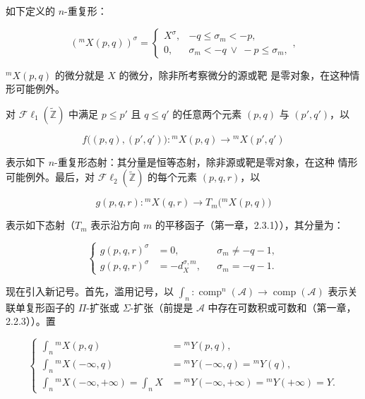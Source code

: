 \clearpage
{}%
\begingroup\small\setlength{\parskip}{0pt}\setlength{\emergencystretch}{1.5em}
\setlength{\abovedisplayskip}{4pt plus 2pt minus 2pt}%
\setlength{\belowdisplayskip}{4pt plus 2pt minus 2pt}%

\noindent 如下定义的 $n$-重复形：

\begin{equation}
({}^{m}\!X(p,q))^\sigma=
\begin{cases}
X^\sigma,&-q\leq\sigma_m<-p,\\
0,&\sigma_m<-q\ \lor\ -p\leq\sigma_m,
\end{cases},
\tag{4.1.6.1}
\end{equation}

\noindent ${}^{m}\!X(p,q)$ 的微分就是 $X$ 的微分，除非所考察微分的源或靶
是零对象，在这种情形可能例外。

对 $\mathcal{F}\ell_1(\widetilde{\mathbb Z})$ 中满足 $p\leq p'$ 且
$q\leq q'$ 的任意两个元素 $(p,q)$ 与 $(p',q')$，以

\begin{equation}
f\bigl((p,q),(p',q')\bigr)\colon
{}^{m}\!X(p,q)\longrightarrow{}^{m}\!X(p',q')
\tag{4.1.6.2}
\end{equation}

表示如下 $n$-重复形态射：其分量是恒等态射，除非源或靶是零对象，在这种
情形可能例外。最后，对
$\mathcal{F}\ell_2(\widetilde{\mathbb Z})$ 的每个元素 $(p,q,r)$，以

\begin{equation}
g(p,q,r)\colon{}^{m}\!X(q,r)
\longrightarrow T_m\bigl({}^{m}\!X(p,q)\bigr)
\tag{4.1.6.3}
\end{equation}

表示如下态射（$T_m$ 表示沿方向 $m$ 的平移函子（第一章，2.3.1）），其分量为：

\begin{equation}
\left\{
\begin{aligned}
g(p,q,r)^\sigma&=0,
  &&\sigma_m\neq-q-1,\\
g(p,q,r)^\sigma&=-d_X^{\sigma,m},
  &&\sigma_m=-q-1.
\end{aligned}
\right.
\tag{4.1.6.4}
\end{equation}

现在引入新记号。首先，滥用记号，以
$\int_n\colon\operatorname{comp}^n(\mathcal A)\longrightarrow
\operatorname{comp}(\mathcal A)$ 表示关联单复形函子的 $\Pi$-扩张或
$\Sigma$-扩张（前提是 $\mathcal A$ 中存在可数积或可数和（第一章，
2.2.3））。置

\begin{equation}
\left\{
\begin{aligned}
\int_n{}^{m}\!X(p,q)
  &={}^{m}\!Y(p,q),\\
\int_n{}^{m}\!X(-\infty,q)
  &={}^{m}\!Y(-\infty,q)={}^{m}\!Y(q),\\
\int_n{}^{m}\!X(-\infty,+\infty)=\int_n X
  &={}^{m}\!Y(-\infty,+\infty)={}^{m}\!Y(+\infty)=Y.
\end{aligned}
\right.
\tag{4.1.6.5}
\end{equation}
\endgroup
